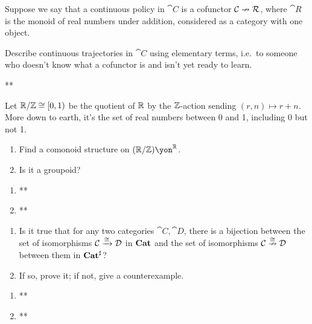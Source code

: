 \documentclass[Book-Poly]{subfiles}
\begin{document}
\begin{exercise}
Suppose we say that a continuous policy in $\cat{C}$ is a cofunctor $\mathcal{C}\nrightarrow\mathcal{R}$, where $\cat{R}$ is the monoid of real numbers under addition, considered as a category with one object. 

Describe continuous trajectories in $\cat{C}$ using elementary terms, i.e.\ to someone who doesn't know what a cofunctor is and isn't yet ready to learn.
\begin{solution}
**
\end{solution}
\end{exercise}

\begin{exercise}
Let $\mathbb{R}/\mathbb{Z}\cong[0,1)$ be the quotient of $\mathbb{R}$ by the $\mathbb{Z}$-action sending $(r,n)\mapsto r+n$. More down to earth, it's the set of real numbers between 0 and 1, including 0 but not 1.%
\begin{enumerate}
	\item Find a comonoid structure on $(\rr/\zz)\yon^\rr$.
	\item Is it a groupoid?
\qedhere
\end{enumerate}
\begin{solution}
\begin{enumerate}
    \item **
    \item **
\end{enumerate}
\end{solution}
\end{exercise}

\begin{exercise}
\begin{enumerate}
	\item Is it true that for any two categories $\cat{C},\cat{D}$, there is a bijection between the set of isomorphisms $\mathcal{C}\xrightarrow{\cong}\mathcal{D}$ in $\mathbf{Cat}$ and the set of isomorphisms $\mathcal{C}\overset{\cong}{\nrightarrow}\mathcal{D}$ between them in $\mathbf{Cat}^\sharp$?
	\item If so, prove it; if not, give a counterexample.
\qedhere
\end{enumerate}
\begin{solution}
\begin{enumerate}
    \item **
    \item **
\end{enumerate}
\end{solution}
\end{exercise}
\end{document}
